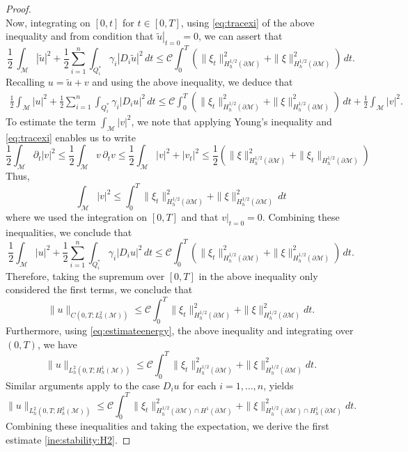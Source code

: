 \documentclass[11pt,oneside,leqno]{amsart}
\numberwithin{equation}{section}
\numberwithin{equation}{section}
\begin{document}
\begin{proof}
\[\]
Now, integrating on $[0,t]$ for $t\in [0,T]$, using \eqref{eq:tracexi} of the above inequality and from condition that $\left.\tilde{u}\right|_{t=0}=0$, we can assert that
\begin{equation}\label{eqE}
    \frac{1}{2} \, \int_{\mathcal{M}}|\tilde{u}|^2+ \frac{1}{2}\sum_{i=1}^{n}\int_{Q_i^{*}} \gamma_i|D_i\tilde{u}|^2\, dt \leq \mathcal{C}\int_{0}^{T}\left(\|\xi_t\|^2_{ H_h^{1/2}(\partial \mathcal{M})}+\|\xi\|^2_{H_h^{1/2}(\partial \mathcal{M})}\right)\, dt.
\end{equation}
Recalling $u = \tilde{u} + v$ and using the above inequality, we deduce that
\[
\begin{aligned}
\frac{1}{2}\int_{\mathcal{M}}|u|^2+\frac{1}{2}\sum_{i=1}^{n}\int_{Q_i^{*}}\gamma_i|D_iu|^2\,dt\leq \mathcal{C}\int_{0}^{T}\left(\|\xi_t\|^2_{ H_h^{1/2}(\partial \mathcal{M})}+\|\xi\|^2_{H_h^{1/2}(\partial \mathcal{M})}\right)\, dt+\frac{1}{2}\int_{\mathcal{M}}|v|^2.
\end{aligned}
\]
To estimate the term $\displaystyle \int_{\mathcal{M}}|v|^2$, we note that applying Young's inequality and \eqref{eq:tracexi} enables us to write
\[
\frac{1}{2}\int_{\mathcal{M}}\partial_{t}|v|^2\leq \frac{1}{2}\int_{\mathcal{M}}v\,\partial_{t}v\leq \frac{1}{2}\int_{\mathcal{M}}|v|^2+|v_{t}|^2\leq \frac{1}{2}\left(\|\xi\|^2_{H^{1/2}_{h}(\partial \mathcal{M})}+\|\xi_{t}\|_{H^{1/2}_{h}(\partial\mathcal{M})}\right)  
\]
Thus, 
\[
\int_{\mathcal{M}}|v|^2\leq \int_0^{T}\|\xi_{t}\|^2_{H_{h}^{1/2}(\partial\mathcal{M})}+\|\xi\|^2_{H_{h}^{1/2}(\partial \mathcal{M})}\,dt
\]
where we used the integration on $[0,T]$ and that $\left.v\right|_{t=0}=0$.
Combining these inequalities, we conclude that
\begin{equation}\label{eq:estimateenergy}
  \frac{1}{2}\int_{\mathcal{M}}|u|^2+\frac{1}{2}\sum_{i=1}^{n}\int_{Q_i^{*}}\gamma_i|D_iu|^2\,dt\leq \mathcal{C}\int_{0}^{T}\left(\|\xi_t\|^2_{ H_h^{1/2}(\partial \mathcal{M})}+\|\xi\|^2_{H_h^{1/2}(\partial \mathcal{M})}\right)\, dt.
\end{equation}
Therefore, taking the supremum over $[0,T]$ in the above inequality only considered the first terms, we conclude that
\begin{equation*}
\|u\|_{C(0,T; L_h^2(\mathcal{M}))} \leq \mathcal{C}\int_{0}^{T} \|\xi_{t}\|^2_{H^{1/2}_{h}(\partial \mathcal{M})}+\|\xi\|^2_{H_{h}^{1/2}(\partial\mathcal{M})} dt.
\end{equation*}
Furthermore, using \eqref{eq:estimateenergy}, the above inequality and integrating over $(0,T)$, we have
\begin{equation*}
\|u\|_{L_h^2(0,T; H^1_{h}(\mathcal{M}))} \leq\mathcal{C}\int_{0}^{T} \|\xi_{t}\|^2_{H^{1/2}_{h}(\partial \mathcal{M})}+\|\xi\|^2_{H_{h}^{1/2}(\partial\mathcal{M})} dt.
\end{equation*}
Similar arguments apply to the case $D_iu$ for each $i=1,\ldots,n$, yields
\[
\|u\|_{L_h^2(0,T; H_{h}^2(\mathcal{M}))} \leq\mathcal{C}\int_{0}^{T} \|\xi_{t}\|^2_{H^{1/2}_{h}(\partial \mathcal{M})\cap H^{1}(\partial\mathcal{M})}+\|\xi\|^2_{H_{h}^{1/2}(\partial\mathcal{M})\cap H^1_{h}(\partial\mathcal{M})} dt.
\]
Combining these inequalities and taking the expectation, we derive the first estimate \eqref{ine:stability:H2}.


\end{proof}
\end{document}
